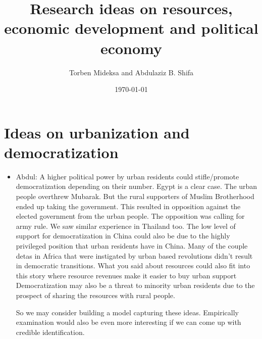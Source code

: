\documentclass[12pt]{article}%
\title{Research ideas on resources, economic development and political economy}
\author{Torben Mideksa and Abdulaziz B. Shifa}
\date{\today}
\begin{document}
\maketitle
\section{Ideas on urbanization and democratization}
\begin{itemize}
    \item Abdul: A higher political power by urban residents could stifle/promote democratization depending on their number. Egypt is a clear case. The urban people overthrew Mubarak. But the rural supporters of Muslim Brotherhood ended up taking the government. This resulted in opposition against the elected government from the urban people. The opposition was calling for army rule. We saw similar experience in Thailand too. The low level of support for democratization in China could also be due to the highly privileged position that urban residents have in China. Many of the couple detas in Africa that were instigated by urban based revolutions didn't result in democratic transitions. What you said about resources could also fit into this story where resource revenues make it easier to buy urban support
 Democratization may also be a threat to minority urban residents due to the prospect of sharing the resources with rural people.

So we may consider building a model capturing these ideas. Empirically examination would also be even more interesting if we can come up with credible identification. 
\end{itemize}
\end{document}
